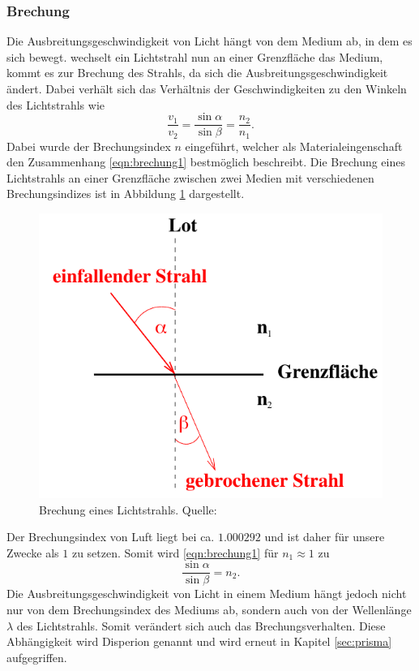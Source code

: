 \subsubsection*{Brechung}
\label{sec:brechung}
Die Ausbreitungsgeschwindigkeit von Licht hängt von dem Medium ab, in dem es sich bewegt. wechselt ein Lichtstrahl
nun an einer Grenzfläche das Medium, kommt es zur Brechung des Strahls, da sich die Ausbreitungsgeschwindigkeit
ändert. Dabei verhält sich das Verhältnis der Geschwindigkeiten zu den Winkeln des Lichtstrahls wie
\begin{equation}
    \frac{v_1}{v_2}=\frac{\sin\alpha}{\sin\beta}=\frac{n_2}{n_1}.
    \label{eqn:brechung1}
\end{equation}
Dabei wurde der Brechungsindex $n$ eingeführt, welcher als Materialeingenschaft den Zusammenhang \ref{eqn:brechung1}
bestmöglich beschreibt. Die Brechung eines Lichtstrahls an einer Grenzfläche zwischen zwei Medien mit verschiedenen
Brechungsindizes ist in Abbildung \ref{fig:brechung} dargestellt.
\begin{figure}[H]
    \centering
    \includegraphics[scale = 0.5]{pictures/Brechung.png}
    \caption{Brechung eines Lichtstrahls. Quelle: \cite{AP01}}
    \label{fig:brechung}
\end{figure}
\noindent
Der Brechungsindex von Luft liegt bei ca. $\num{1.000292}$ \cite{AP01} und ist daher für unsere Zwecke als $1$
zu setzen. Somit wird \ref{eqn:brechung1} für $n_1\approx1$ zu
\begin{equation}
    \frac{\sin\alpha}{\sin\beta}=n_2.
    \label{eqn:brechung2}
\end{equation}
Die Ausbreitungsgeschwindigkeit von Licht in einem Medium hängt jedoch nicht nur von dem Brechungsindex des Mediums
ab, sondern auch von der Wellenlänge $\lambda$ des Lichtstrahls. Somit verändert sich auch das Brechungsverhalten.
Diese Abhängigkeit wird Disperion genannt und wird erneut in Kapitel \ref{sec:prisma} aufgegriffen.

